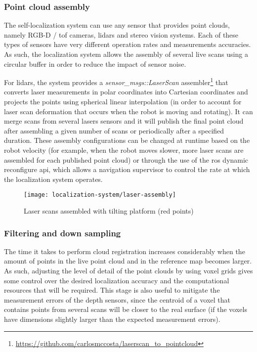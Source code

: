 \subsubsection{Point cloud assembly}

The self-localization system can use any sensor that provides point clouds, namely RGB-D / \gls{tof} cameras, \glspl{lidar} and stereo vision systems. Each of these types of sensors have very different operation rates and measurements accuracies. As such, the localization system allows the assembly of several live scans using a circular buffer in order to reduce the impact of sensor noise.

For \glspl{lidar}, the system provides a \emph{sensor\_msgs::LaserScan} assembler\footnote{\url{https://github.com/carlosmccosta/laserscan_to_pointcloud}} that converts laser measurements in polar coordinates into Cartesian coordinates and projects the points using spherical linear interpolation (in order to account for laser scan deformation that occurs when the robot is moving and rotating). It can merge scans from several lasers sensors and it will publish the final point cloud after assembling a given number of scans or periodically after a specified duration. These assembly configurations can be changed at runtime based on the robot velocity (for example, when the robot moves slower, more laser scans are assembled for each published point cloud) or through the use of the \gls{ros} dynamic reconfigure \gls{api}, which allows a navigation supervisor to control the rate at which the localization system operates.


\begin{figure}[H]
	\centering
	\texttt{[image: localization-system/laser-assembly]}
	\caption{Laser scans assembled with tilting platform (red points)}
	\label{fig:localization-system_section_laser_assembly}
\end{figure}


\subsubsection{Filtering and down sampling}

The time it takes to perform cloud registration increases considerably when the amount of points in the live point cloud and in the reference map becomes larger. As such, adjusting the level of detail of the point clouds by using voxel grids gives some control over the desired localization accuracy and the computational resources that will be required. This stage is also useful to mitigate the measurement errors of the depth sensors, since the centroid of a voxel that contains points from several scans will be closer to the real surface (if the voxels have dimensions slightly larger than the expected measurement errors).

